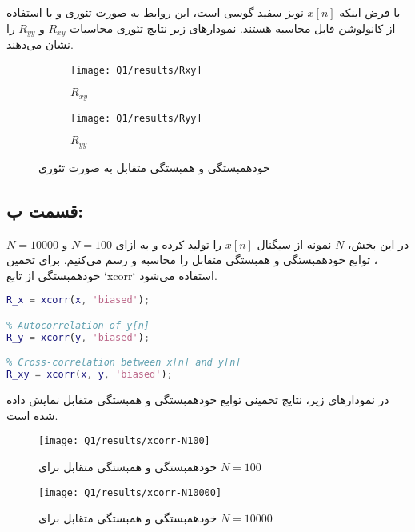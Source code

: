 \documentclass[12pt,onecolumn,a4paper]{article}
\begin{document}
		با فرض اینکه \( x[n] \) نویز سفید گوسی است، این روابط به صورت تئوری و با استفاده از کانولوشن قابل محاسبه هستند. نمودارهای زیر نتایج تئوری محاسبات \( R_{xy} \) و \( R_{yy} \) را نشان می‌دهند.
		
		\begin{figure}[H]
			\centering
			\begin{subfigure}{.45\linewidth}
				\centering
				\texttt{[image: Q1/results/Rxy]}
				\caption{$R_{xy}$}
				\label{fig:rxy}
			\end{subfigure}
			\hfill
			\begin{subfigure}{.45\linewidth}
				\centering
				\texttt{[image: Q1/results/Ryy]}
				\caption{$R_{yy}$}
				\label{fig:ryy}
			\end{subfigure}
			\caption{خودهمبستگی و همبستگی متقابل به صورت تئوری}
		\end{figure}
		
		\FloatBarrier
		\subsection{قسمت ب:}

		
		در این بخش، \( N \) نمونه از سیگنال \( x[n] \) را تولید کرده و به ازای \( N = 100 \) و \( N = 10000 \)، توابع خودهمبستگی و همبستگی متقابل را محاسبه و رسم می‌کنیم. برای تخمین خودهمبستگی از تابع `xcorr` استفاده می‌شود.
		
\begin{latin}
\begin{lstlisting}[language=Matlab]
% Autocorrelation of x[n]
R_x = xcorr(x, 'biased');

% Autocorrelation of y[n]
R_y = xcorr(y, 'biased');

% Cross-correlation between x[n] and y[n]
R_xy = xcorr(x, y, 'biased');
\end{lstlisting}
\end{latin}
		
		در نمودارهای زیر، نتایج تخمینی توابع خودهمبستگی و همبستگی متقابل نمایش داده شده است.
		
		\begin{figure}
			\centering
			\texttt{[image: Q1/results/xcorr-N100]}
			\caption{خودهمبستگی و همبستگی متقابل برای \( N = 100 \)}
			\label{fig:xcorr-n100}
		\end{figure}
		
		\begin{figure}
			\centering
			\texttt{[image: Q1/results/xcorr-N10000]}
			\caption{خودهمبستگی و همبستگی متقابل برای \( N = 10000 \)}
			\label{fig:xcorr-n10000}
		\end{figure}
		
\end{document}
